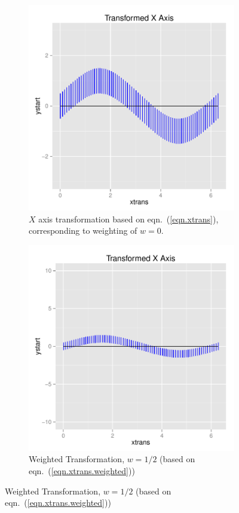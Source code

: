 \documentclass[12pt]{article}\usepackage[]{graphicx}\usepackage[]{color}
\begin{document}
\begin{figure}[h!tbp]\centering
\begin{subfigure}[b]{.45\linewidth}\centering 
\includegraphics[keepaspectratio=TRUE,width=\linewidth]{figure/fig-xtransform1}
\caption[$X$ axis transformation]{$X$ axis transformation based on eqn.~(\ref{eqn.xtrans}), corresponding to weighting of $w=0$.}
\label{fig:xtrans1}
\end{subfigure} \hfill\hfill
\begin{subfigure}[b]{.45\linewidth}\centering
\includegraphics[keepaspectratio=TRUE,width=\linewidth]{figure/fig-xtransform2} 
\caption[Weighted transformation]{Weighted Transformation, $w=1/2$ (based on eqn.~(\ref{eqn.xtrans.weighted}))}
\label{fig:xtrans2}
\end{subfigure}


\end{figure}
\end{document}
